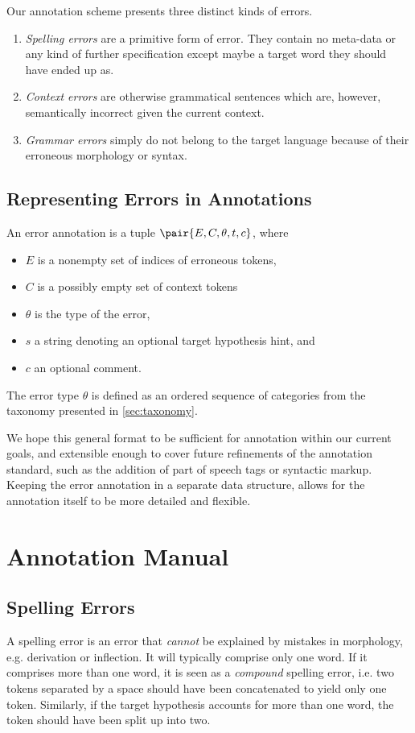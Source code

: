 \documentclass[12pt]{article}
\begin{document}
Our annotation scheme presents three distinct kinds of errors.

\begin{enumerate}
\item \textit{Spelling errors} are a primitive form of error. They contain no
meta-data or any kind of further specification except maybe a target word they
should have ended up as.
\item \textit{Context errors} are otherwise grammatical sentences which are,
however, semantically incorrect given the current context.
\item \textit{Grammar errors} simply do not belong to the target language because
of their erroneous morphology or syntax.
\end{enumerate}

\subsection{Representing Errors in Annotations}\label{sec:errorformat}

An error annotation is a tuple $\pair{E,C,\theta,t,c}$, where
\begin{itemize}
  \item $E$ is a nonempty set of indices of erroneous tokens,
  \item $C$ is a possibly empty set of context tokens 
  \item $\theta$ is the type of the error,
  \item $s$ a string denoting an optional target hypothesis hint, and
  \item $c$ an optional comment.
\end{itemize}

The error type $\theta$ is defined as an ordered sequence of categories from the
taxonomy presented in \ref{sec:taxonomy}.

We hope this general format to be sufficient for annotation within our current
goals, and extensible enough to cover future refinements of the annotation
standard, such as the addition of part of speech tags or syntactic markup.
Keeping the error annotation in a separate data structure, allows for the
annotation itself to be more detailed and flexible.

\section{Annotation Manual}\label{sec:manual}

\subsection{Spelling Errors}\label{sec:speling}
A spelling error is an error that \textit{cannot} be explained by mistakes in
morphology, e.g. derivation or inflection. It will typically comprise only one
word. If it comprises more than one word, it is seen as a \textit{compound}
spelling error, i.e. two tokens separated by a space should have been
concatenated to yield only one token. Similarly, if the target hypothesis
accounts for more than one word, the token should have been split up into two.
\end{document}
